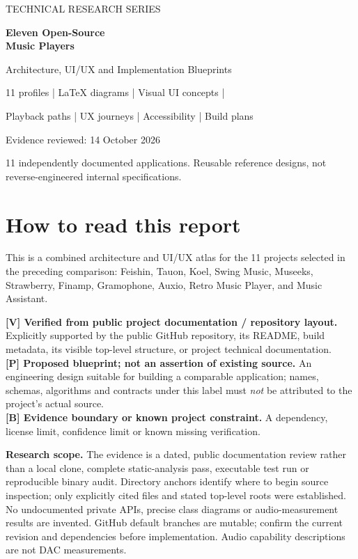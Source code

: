 \documentclass[10pt,a4paper,oneside]{report}
\newcommand{\tagverified}{\textbf{[V] Verified from public project documentation / repository layout.}}
\newcommand{\tagproposal}{\textbf{[P] Proposed blueprint; not an assertion of existing source.}}
\newcommand{\tagboundary}{\textbf{[B] Evidence boundary or known project constraint.}}
\begin{document}
\begin{titlepage}
\pagecolor{navy}\color{white}
\vspace*{25mm}
{\Large TECHNICAL RESEARCH SERIES}\par\vspace{10mm}
{\fontsize{30}{36}\selectfont\bfseries Eleven Open-Source\\Music Players}\par\vspace{7mm}
{\fontsize{20}{26}\selectfont Architecture, UI/UX and Implementation Blueprints}\par\vspace{12mm}
{\color{white!80}\large 11 profiles | LaTeX diagrams | Visual UI concepts |\par
Playback paths | UX journeys | Accessibility | Build plans}\par
\vfill
{\large Evidence reviewed: 14 October 2026}\par\vspace{4mm}
{\small 11 independently documented applications. Reusable reference designs, not reverse-engineered internal specifications.}\par\vspace{15mm}
\end{titlepage}
\pagecolor{white}\color{ink}
\chapter*{How to read this report}
This is a combined architecture and UI/UX atlas for the 11 projects selected in the preceding comparison: Feishin, Tauon, Koel, Swing Music, Museeks, Strawberry, Finamp, Gramophone, Auxio, Retro Music Player, and Music Assistant.
\begin{evidencebox}
\tagverified{} Explicitly supported by the public GitHub repository, its README, build metadata, its visible top-level structure, or project technical documentation.\\[3pt]
\tagproposal{} An engineering design suitable for building a comparable application; names, schemas, algorithms and contracts under this label must \emph{not} be attributed to the project's actual source.\\[3pt]
\tagboundary{} A dependency, license limit, confidence limit or known missing verification.
\end{evidencebox}
\textbf{Research scope.} The evidence is a dated, public documentation review rather than a local clone, complete static-analysis pass, executable test run or reproducible binary audit. Directory anchors identify where to begin source inspection; only explicitly cited files and stated top-level roots were established. No undocumented private APIs, precise class diagrams or audio-measurement results are invented. GitHub default branches are mutable; confirm the current revision and dependencies before implementation. Audio capability descriptions are not DAC measurements.
\end{document}
